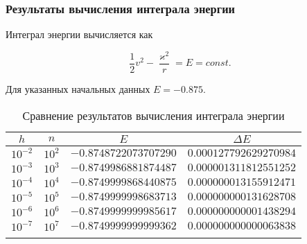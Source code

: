 \begin{frame}
\frametitle{Результаты вычисления интеграла энергии}

Интеграл энергии вычисляется как

\su
\begin{equation}
  \frac{1}{2} v^2 - \frac{\varkappa^2}{r} = E = const.
\end{equation}

Для указанных начальных данных $ E = -0.875 $.

\begin{table}[h]
  \centering
  \caption{Сравнение результатов вычисления интеграла энергии}
  \begin{tabular}{cccc}
    \toprule
    $ h $ &
    $ n $ &
    $ E $ &
    $ \Delta E $ \\
    \midrule
    $ 10^{-2} $ & $ 10^2 $ & $ -0.8748722073707290 $ & $ 0.000127792629270984 $ \\
    \arrayrulecolor{black!40}
    \midrule
    $ 10^{-3} $ & $ 10^3 $ & $ -0.8749986881874487 $ & $ 0.000001311812551252 $ \\
    \midrule
    $ 10^{-4} $ & $ 10^4 $ & $ -0.8749999868440875 $ & $ 0.000000013155912471 $ \\
    \midrule
    $ 10^{-5} $ & $ 10^5 $ & $ -0.8749999998683713 $ & $ 0.000000000131628708 $ \\
    \midrule
    $ 10^{-6} $ & $ 10^6 $ & $ -0.8749999999985617 $ & $ 0.000000000001438294 $ \\
    \midrule
    $ 10^{-7} $ & $ 10^7 $ & $ -0.8749999999999362 $ & $ 0.000000000000063838 $ \\
    \arrayrulecolor{black}
    \bottomrule
  \end{tabular}
\end{table}

\end{frame}

